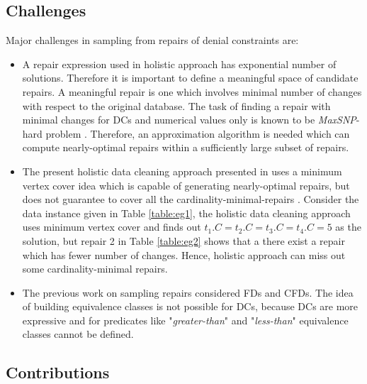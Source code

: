 \subsection{Challenges}
Major challenges in sampling from repairs of denial constraints are:

\begin{itemize}
\item A repair expression used in holistic approach \cite{XuChu} has exponential number of solutions.
Therefore it is important to define a meaningful space of candidate repairs.
A meaningful repair is one which involves minimal number of changes with respect to the original database.
The task of finding a repair with minimal changes for DCs and numerical values only is known to be \textit{MaxSNP}-hard problem \cite{Bertossi}.
Therefore, an approximation algorithm is needed which can compute nearly-optimal repairs within a sufficiently large subset of repairs.

\item The present holistic data cleaning approach presented in \cite{XuChu} uses a minimum vertex cover idea which is capable of generating nearly-optimal repairs, but does not guarantee to cover all the cardinality-minimal-repairs \cite{Beskales_sampling}.
Consider the data instance given in Table \ref{table:eg1}, the holistic data cleaning approach uses minimum vertex cover and finds out $t_1.C = t_2.C = t_3.C = t_4.C = 5$ as the solution, but repair 2 in Table \ref{table:eg2} shows that a there exist a repair which has fewer number of changes.
Hence, holistic approach can miss out some cardinality-minimal repairs.

\item The previous work on sampling repairs \cite{Beskales_sampling} considered FDs and CFDs.
The idea of building equivalence classes is not possible for DCs, because DCs are more expressive and for predicates like "\textit{greater-than}" and "\textit{less-than}" equivalence classes cannot be defined.
\end{itemize}

\subsection{Contributions}

